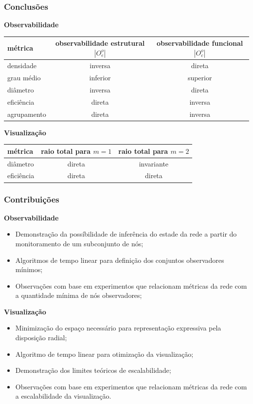 \documentclass[10pt]{beamer}
\begin{document}
\begin{frame}
    \frametitle{Conclusões}

{\bf Observabilidade}

\footnotesize
\begin{tabular}{lcc}
\toprule
métrica     & observabilidade estrutural $|O^o_e|$
            & observabilidade funcional  $|O^o_c|$ \\
\midrule
densidade   & inversa  
            & direta  \\
grau médio  & inferior
            & superior\\
diâmetro    & inversa 
            & direta  \\
eficiência  & direta  
            & inversa \\
agrupamento & direta  
            & inversa \\
\bottomrule
\end{tabular}

\vfill

\normalsize
{\bf Visualização}

\footnotesize
\begin{tabular}{p{7em}cc}
\toprule
métrica     & raio total para $m=1$ & raio total para $m=2$ \\
\midrule
diâmetro    & direta & invariante \\
eficiência  & direta & direta \\
\bottomrule
\end{tabular}

\end{frame}

\begin{frame}
    \frametitle{Contribuições}

{\bf Observabilidade}

\begin{itemize}
\item Demonstração da possíbilidade de inferência do estade da rede a partir
    do monitoramento de um subconjunto de nós;
\item Algoritmos de tempo linear para definição dos conjuntos observadores
    mínimos;
\item Observações com base em experimentos que relacionam métricas da rede
    com a quantidade mínima de nós observadores;
\end{itemize}

{\bf Visualização}

\begin{itemize}
\item Minimização do espaço necessário para representação expressiva pela
    disposição radial;
\item Algoritmo de tempo linear para otimização da visualização;
\item Demonstração dos limites teóricos de escalabilidade;
\item Observações com base em experimentos que relacionam métricas da rede
    com a escalabilidade da visualização.
\end{itemize}

\end{frame}
\end{document}
